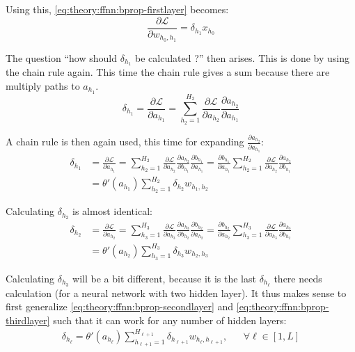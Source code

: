 Using this, \eqref{eq:theory:ffnn:bprop-firstlayer} becomes:
\begin{equation}
\frac{\partial \mathcal{L}}{\partial w_{h_0, h_1}} = \delta_{h_1} x_{h_0}
\label{eq:theory:ffnn:bprop-w01}
\end{equation}

The question ``how should $\delta_{h_1}$ be calculated ?'' then arises. This is done by using the chain rule again. This time the chain rule gives a sum because there are multiply paths to $a_{h_1}$.
\begin{equation}
\delta_{h_1} = \frac{\partial \mathcal{L}}{\partial a_{h_1}} = \sum_{h_2=1}^{H_2} \frac{\partial \mathcal{L}}{\partial a_{h_2}} \frac{\partial a_{h_2}}{\partial a_{h_1}}
\end{equation}

A chain rule is then again used, this time for expanding $\frac{\partial a_{h_2}}{\partial a_{h_1}}$:
\begin{equation}
\begin{aligned}
\delta_{h_1}
&= \frac{\partial \mathcal{L}}{\partial a_{h_1}}
= \sum_{h_2=1}^{H_2} \frac{\partial \mathcal{L}}{\partial a_{h_2}} \frac{\partial a_{h_2}}{\partial b_{h_1}} \frac{\partial b_{h_1}}{\partial a_{h_1}}
= \frac{\partial b_{h_1}}{\partial a_{h_1}} \sum_{h_2=1}^{H_2} \frac{\partial \mathcal{L}}{\partial a_{h_2}} \frac{\partial a_{h_2}}{\partial b_{h_1}} \\
&= \theta'(a_{h_1}) \sum_{h_2=1}^{H_2} \delta_{h_2} w_{h_1, h_2}
\end{aligned}
\label{eq:theory:ffnn:bprop-secondlayer}
\end{equation}

Calculating $\delta_{h_2}$ is almost identical:
\begin{equation}
\begin{aligned}
\delta_{h_2}
&= \frac{\partial \mathcal{L}}{\partial a_{h_2}}
= \sum_{h_3=1}^{H_3} \frac{\partial \mathcal{L}}{\partial a_{h_3}} \frac{\partial a_{h_3}}{\partial b_{h_2}} \frac{\partial b_{h_2}}{\partial a_{h_2}}
= \frac{\partial b_{h_2}}{\partial a_{h_2}} \sum_{h_3=1}^{H_3} \frac{\partial \mathcal{L}}{\partial a_{h_3}} \frac{\partial a_{h_3}}{\partial b_{h_2}} \\
&= \theta'(a_{h_2}) \sum_{h_3=1}^{H_3} \delta_{h_3} w_{h_2, h_3}
\end{aligned}
\label{eq:theory:ffnn:bprop-thirdlayer}
\end{equation}

Calculating $\delta_{h_3}$ will be a bit different, because it is the last $\delta_{h_\ell}$ there needs calculation (for a neural network with two hidden layer). It thus makes sense to first generalize \eqref{eq:theory:ffnn:bprop-secondlayer} and \eqref{eq:theory:ffnn:bprop-thirdlayer} such that it can work for any number of hidden layers:
\begin{equation}
\begin{aligned}
\delta_{h_\ell} = \theta'(a_{h_\ell}) \sum_{h_{\ell+1}=1}^{H_{\ell+1}} \delta_{h_{\ell+1}} w_{h_\ell, h_{\ell+1}}, && \forall \ell \in [1, L]
\end{aligned}
\label{eq:theory:ffnn:bprop-genalized}
\end{equation}

